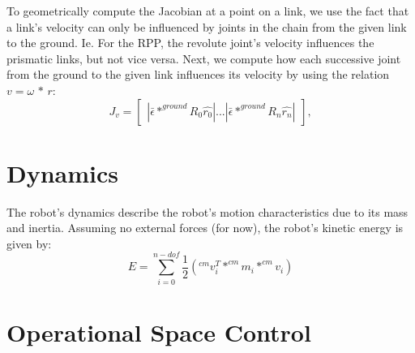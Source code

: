 \documentclass[12pt]{article}
\begin{document}
To geometrically compute the Jacobian at a point on a link, we use the fact that a link's 
velocity can only be influenced by joints in the chain from the given link to the ground. Ie.
For the RPP, the revolute joint's velocity influences the prismatic links, but not vice versa.
Next, we compute how each successive joint from the ground to the given link influences its
velocity by using the relation $v = \omega\, *\, r$:
\begin{equation}
  J_v = 
  \begin{bmatrix} 
   | \bar{\epsilon} * ^{ground}R_0 \hat{r_0} | ... | \bar{\epsilon} * ^{ground}R_n \hat{r_n} |
  \end{bmatrix},
\end{equation}

\section{Dynamics}
The robot's dynamics describe the robot's motion characteristics due to its mass and inertia. 
Assuming no external forces (for now), the robot's kinetic energy is given by:
\begin{equation}
  E = \sum_{i=0}^{n-dof} \frac{1}{2} (^{cm}v_i^T * ^{cm} m_i * ^{cm} v_i)
\end{equation}


\section{Operational Space Control}
\end{document}
